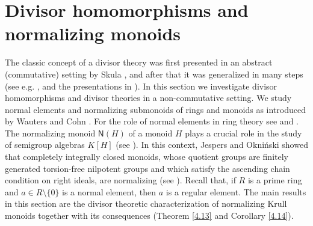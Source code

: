 \documentclass[a4paper]{amsart}
\theoremstyle{definition}
\numberwithin{equation}{section}
\begin{document}
\bigskip
\section{Divisor homomorphisms and normalizing monoids}
\label{4}
\bigskip

The classic concept of a divisor theory was first presented in an
abstract (commutative) setting by  Skula \cite{Sk70}, and after
that it was generalized in many steps (see e.g. \cite{Ge-HK94}, and
the presentations in \cite{HK98, Ge-HK06a}). In this section we
investigate divisor homomorphisms and divisor theories in a
non-commutative setting. We study normal elements and normalizing
submonoids of rings and monoids as introduced by  Wauters
\cite{Wa84a} and  Cohn \cite[Section 3.1]{Co85a}. For the role
of normal elements in ring theory see \cite[Chapter 12]{Go-Wa04a} and \cite[Chapter 10]{Mc-Ro01a}.
The normalizing monoid $\mathsf N (H)$ of a monoid $H$ plays a
crucial role in the study of semigroup algebras $K[H]$ (see \cite{Je-Ok07a}).
In this context, Jespers and Okni{\'n}ski showed that completely integrally closed monoids, whose quotient groups are finitely generated
torsion-free nilpotent groups and which satisfy the ascending chain condition on right ideals, are normalizing (see \cite[Theorem 2]{Je-Ok99a}).
Recall that, if $R$ is a prime ring and $a \in R
\setminus \{0\}$ is a normal element, then $a$ is a regular element.
The main results in this section are the divisor theoretic
characterization of normalizing Krull monoids together with its
consequences (Theorem \ref{4.13} and Corollary \ref{4.14}).
\end{document}
